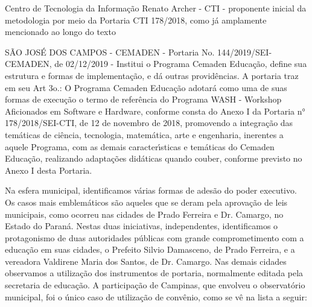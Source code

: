 \documentclass[
12pt,		%
openright,	%
twoside,  %
a4paper,			%
chapter=TITLE,		%
english,			%
french,				%
spanish,			%
brazil				%
]{USPSC-classe/USPSC}
\begin{document}
\begin{alineas}
\item Centro de Tecnologia da Informa\c{c}\~ao Renato Archer - CTI - proponente inicial da metodologia por meio da Portaria CTI 178/2018, como j\'a amplamente mencionado ao longo do texto
\item S\~AO JOS\'E DOS CAMPOS - CEMADEN - Portaria No. 144/2019/SEI-CEMADEN, de 02/12/2019 - Institui o Programa Cemaden Educa\c{c}\~ao, define sua estrutura e formas de implementa\c{c}\~ao, e d\'a outras provid\^encias. A portaria traz em seu Art 3o.: O Programa Cemaden Educa\c{c}\~ao adotar\'a como uma de suas formas de execu\c{c}\~ao o termo de refer\^encia do Programa WASH - Workshop Aficionados em Software e Hardware, conforme consta do Anexo I da Portaria n° 178/2018/SEI-CTI, de 12 de novembro de 2018, promovendo a integra\c{c}\~ao das tem\'aticas de ci\^encia, tecnologia, matem\'atica, arte e engenharia, inerentes a aquele Programa, com as demais caracter\'{\i}sticas e tem\'aticas do Cemaden Educa\c{c}\~ao, realizando adapta\c{c}\~oes did\'aticas quando couber, conforme previsto no Anexo I desta Portaria.
\end{alineas}

Na esfera municipal, identificamos  v\'arias formas de ades\~ao do poder executivo. Os casos mais emblem\'aticos s\~ao aqueles que se deram pela aprova\c{c}\~ao de leis municipais, como ocorreu nas cidades de Prado Ferreira e Dr. Camargo, no Estado do Paran\'a. Nestas duas iniciativas, independentes, identificamos o protagonismo de duas autoridades p\'ublicas com grande comprometimento com a educa\c{c}\~ao em suas cidades, o Prefeito Silvio Damasceno, de Prado Ferreira, e a vereadora Valdirene Maria dos Santos, de Dr. Camargo. Nas demais cidades observamos a utiliza\c{c}\~ao dos instrumentos de portaria, normalmente editada pela secretaria de educa\c{c}\~ao. A participa\c{c}\~ao de Campinas, que envolveu o observat\'orio municipal, foi o \'unico caso de utiliza\c{c}\~ao de conv\^enio, como se v\^e na lista a seguir:
\end{document}
